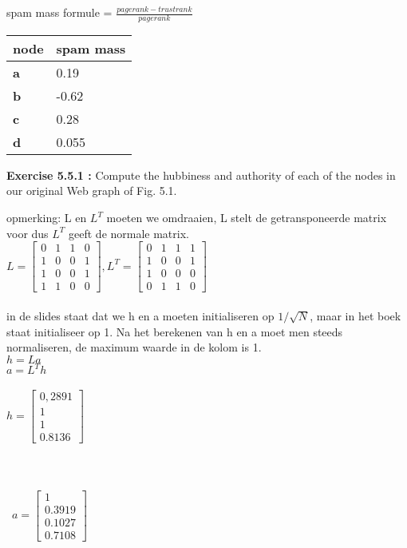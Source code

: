 \documentclass{exam}
\begin{document}
\begin{questions}
spam mass formule = $\frac{pagerank - trustrank}{pagerank}$

    \begin{tabular}{ | l | l | }
    \hline
    \textbf{node} & \textbf{spam mass} \\ \hline
    \textbf{a} & 0.19 \\ \hline
    \textbf{b} & -0.62\\ \hline
    \textbf{c} &  0.28 \\ \hline
    \textbf{d} &  0.055 \\
    \hline
    \end{tabular}



\question \textbf{Exercise 5.5.1 :} Compute the hubbiness and authority of each of the nodes in our original Web graph of Fig. 5.1.

opmerking: L en $L^T$ moeten we omdraaien, L stelt de getransponeerde matrix voor dus $L^T$ geeft de normale matrix.\\

$L = \begin{bmatrix}0 & 1 & 1 & 0 \\ 
1 & 0 & 0 & 1 \\ 
1 & 0 & 0 & 1 \\ 
1 & 1 & 0 & 0 \end{bmatrix}, L^T = \begin{bmatrix}0 & 1 & 1 & 1 \\ 
1 & 0 & 0 & 1 \\ 
1 & 0 & 0 & 0 \\ 
0 & 1 & 1 & 0 \end{bmatrix}$\\\\

in de slides staat dat we h en a moeten initialiseren op $1/\sqrt{N}$, maar in het boek staat initialiseer op 1. Na het berekenen van h en a moet men steeds normaliseren, de maximum waarde in de kolom is 1.\\
$h = La$\\
$a = L^Th$\\\\

$h = \begin{bmatrix}0,2891  \\ 
1  \\ 
1  \\ 
0.8136  \end{bmatrix}$\\\\\\\\\
$a = \begin{bmatrix}1  \\ 
0.3919  \\ 
0.1027  \\ 
0.7108  \end{bmatrix}$\\
\end{questions}
\end{document}
